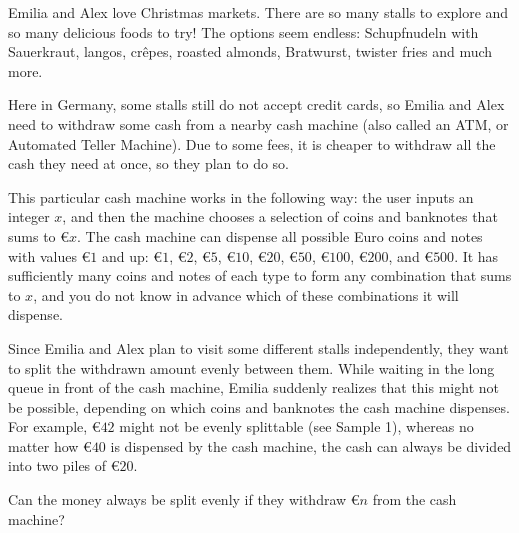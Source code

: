 


Emilia and Alex love Christmas markets.
There are so many stalls to explore and so many delicious foods to try!
The options seem endless: Schupfnudeln with Sauerkraut, langos, crêpes, roasted almonds, Bratwurst, twister fries and much more.

Here in Germany, some stalls still do not accept credit cards, so Emilia and
Alex need to withdraw some cash from a nearby cash machine (also called an ATM,
or Automated Teller Machine).
Due to some fees, it is cheaper to withdraw all the cash they need at once, so they plan to do so.

This particular cash machine works in the following way: the user inputs an integer $x$, and then the machine chooses a selection of coins and banknotes that sums to €$x$.
The cash machine can dispense all possible Euro coins and notes with values €$1$ and up: €$1$, €$2$, €$5$, €$10$, €$20$, €$50$, €$100$, €$200$, and €$500$.
It has sufficiently many coins and notes of each type to form any combination that
sums to $x$, and
you do not know in advance which of these combinations it will dispense.


Since Emilia and Alex plan to visit some different stalls independently, they want to split the withdrawn amount evenly between them.
While waiting in the long queue in front of the cash machine, Emilia suddenly realizes that this might not be possible, depending on which coins and banknotes the cash machine dispenses.
For example, €$42$ might not be evenly splittable (see Sample 1),
whereas no matter how €$40$ is dispensed by the cash machine, the cash can
always be divided into two piles of €$20$.



Can the money always be split evenly if they withdraw €$n$ from the cash machine? 





